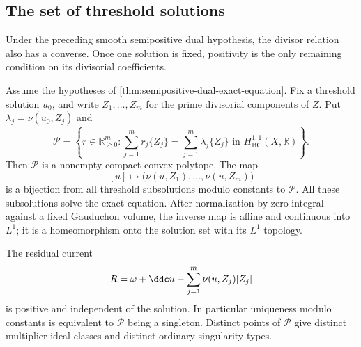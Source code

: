 \subsection{The set of threshold solutions}

Under the preceding smooth semipositive dual hypothesis, the divisor relation also has a converse. Once one solution is fixed, positivity is the only remaining condition on its divisorial coefficients.

\begin{proposition}\label{prop:threshold-solution-polytope}
Assume the hypotheses of \cref{thm:semipositive-dual-exact-equation}. Fix a threshold solution $u_0$, and write $Z_1,\ldots,Z_m$ for the prime divisorial components of $Z$. Put $\lambda_j=\nu(u_0,Z_j)$ and
\[
 \mathcal P=\left\{r\in\mathbb R_{\geq0}^m:
       \sum_{j=1}^m r_j\{Z_j\}
          =\sum_{j=1}^m\lambda_j\{Z_j\}
           \text{ in }H^{1,1}_{\mathrm{BC}}(X,\mathbb R)\right\}.
\]
Then $\mathcal P$ is a nonempty compact convex polytope. The map
\[
 [u]\longmapsto\bigl(\nu(u,Z_1),\ldots,\nu(u,Z_m)\bigr)
\]
is a bijection from all threshold subsolutions modulo constants to $\mathcal P$. All these subsolutions solve the exact equation. After normalization by zero integral against a fixed Gauduchon volume, the inverse map is affine and continuous into $L^1$; it is a homeomorphism onto the solution set with its $L^1$ topology.

The residual current
\[
 R=\omega+\ddc u-\sum_{j=1}^m\nu(u,Z_j)[Z_j]
\]
is positive and independent of the solution. In particular uniqueness modulo constants is equivalent to $\mathcal P$ being a singleton. Distinct points of $\mathcal P$ give distinct multiplier-ideal classes and distinct ordinary singularity types.
\end{proposition}
